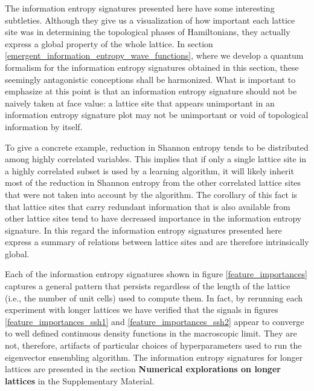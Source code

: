 \documentclass[10pt]{revtex4-1}
\begin{document}
The information entropy signatures presented here have some interesting subtleties. Although they give us a visualization of how important each lattice site was in determining the topological phases of Hamiltonians, they actually express a global property of the whole lattice. In section \ref{emergent_information_entropy_wave_functions}, where we develop a quantum formalism for the information entropy signatures obtained in this section, these seemingly antagonistic conceptions shall be harmonized. What is important to emphasize at this point is that an information entropy signature should not be naively taken at face value: a lattice site that appears unimportant in an information entropy signature plot may not be unimportant or void of topological information by itself.

To give a concrete example, reduction in Shannon entropy tends to be distributed among highly correlated variables. This implies that if only a single lattice site in a highly correlated subset is used by a learning algorithm, it will likely inherit most of the reduction in Shannon entropy from the other correlated lattice sites that were not taken into account by the algorithm. The corollary of this fact is that lattice sites that carry redundant information that is also available from other lattice sites tend to have decreased importance in the information entropy signature.  In this regard the information entropy signatures presented here express a summary of relations between lattice sites and are therefore intrinsically global.

Each of the information entropy signatures shown in figure \ref{feature_importances} captures a general pattern that persists regardless of the length of the lattice (i.e., the number of unit cells) used to compute them. In fact, by rerunning each experiment with longer lattices we have verified that the signals in figures \ref{feature_importances_ssh1} and \ref{feature_importances_ssh2} appear to converge to well defined continuous density functions in the macroscopic limit. They are not, therefore, artifacts of particular choices of hyperparameters used to run the eigenvector ensembling algorithm. The information entropy signatures for longer lattices are presented in the section \textbf{Numerical explorations on longer lattices} in the Supplementary Material.
\end{document}
